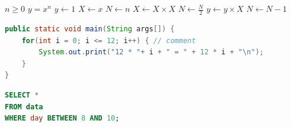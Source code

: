 \begin{figure}[H]
    \caption{\exUICaption}
    \label{fig:wireframe}
\end{figure}

\section{\sectImpl}
\label{sec:implementation}
{\small\itshape\color{gray} \implHelpText}


\begin{algorithm}[H] %
\caption{\exAlgorithmCaption}\label{alg:example}
\begin{algorithmic}
\Require $n \geq 0$
\Ensure $y = x^n$
\State $y \gets 1$
\State $X \gets x$
\State $N \gets n$
        \State $X \gets X \times X$
        \State $N \gets \frac{N}{2}$
        \State $y \gets y \times X$
        \State $N \gets N - 1$
    \EndIf
\EndWhile
\end{algorithmic}
\end{algorithm}

\begin{lstlisting}[language=Java]
public static void main(String args[]) {
    for(int i = 0; i <= 12; i++) { // comment
        System.out.print("12 * "+ i + " = " + 12 * i + "\n");
    }
}
\end{lstlisting}

\begin{lstlisting}[language=SQL,numbers=none]
SELECT *
FROM data
WHERE day BETWEEN 8 AND 10;
\end{lstlisting}
